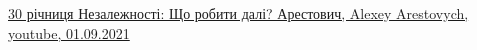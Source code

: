  
 
 
 
 

\href{https://www.youtube.com/watch?v=Yjz1afr2Ar8}{%
30 річниця Незалежності: Що робити далі? Арестович, Alexey Arestovych, youtube, 01.09.2021%
}
